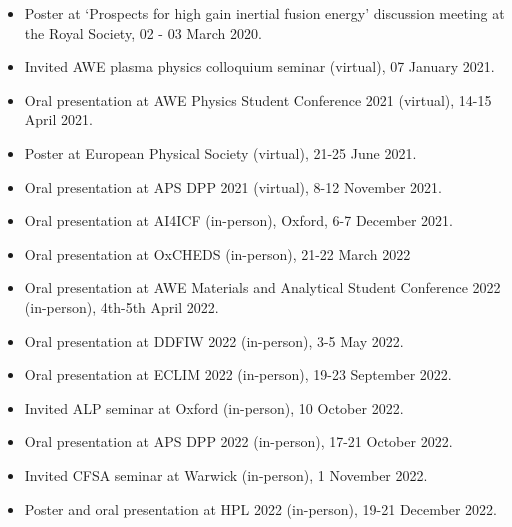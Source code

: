 \begin{itemize}
	\item Poster at `Prospects for high gain inertial fusion energy' discussion meeting at the Royal Society, 02 - 03 March 2020.
	\item Invited AWE plasma physics colloquium seminar (virtual), 07 January 2021.
	\item Oral presentation at AWE Physics Student Conference 2021 (virtual), 14-15 April 2021.
	\item Poster at European Physical Society (virtual), 21-25 June 2021.
	\item Oral presentation at APS DPP 2021 (virtual), 8-12 November 2021.
	\item Oral presentation at AI4ICF (in-person), Oxford, 6-7 December 2021.
	\item Oral presentation at OxCHEDS (in-person), 21-22 March 2022
	\item Oral presentation at AWE Materials and Analytical Student Conference 2022 (in-person), 4th-5th April 2022. 
	\item Oral presentation at DDFIW 2022 (in-person), 3-5 May 2022.
	\item Oral presentation at ECLIM 2022 (in-person), 19-23 September 2022.
	\item Invited ALP seminar at Oxford (in-person), 10 October 2022.
	\item Oral presentation at APS DPP 2022 (in-person), 17-21 October 2022.
	\item Invited CFSA seminar at Warwick (in-person), 1 November 2022.
	\item Poster and oral presentation at HPL 2022 (in-person), 19-21 December 2022.
\end{itemize}


